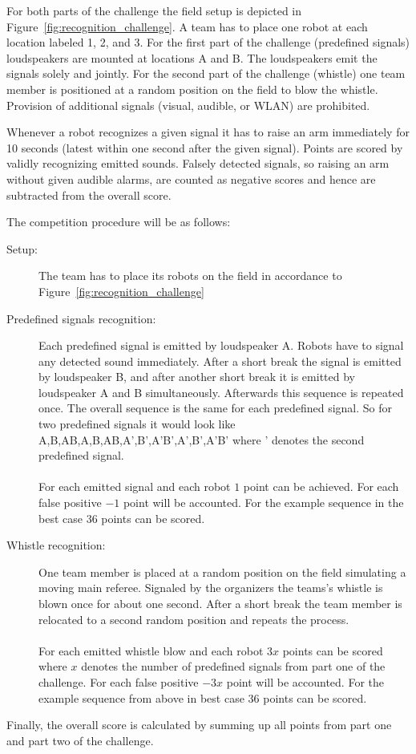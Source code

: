 \documentclass[12pt]{article}
\begin{document}
For both parts of the challenge the field setup is depicted in Figure~\ref{fig:recognition_challenge}. A team has to place one robot at each location labeled 1, 2, and 3. For the first part of the challenge (predefined signals) loudspeakers are mounted at locations A and B. The loudspeakers emit the signals solely and jointly. For the second part of the challenge (whistle) one team member is positioned at a random position on the field to blow the whistle. Provision of additional signals (visual, audible, or WLAN) are prohibited.

Whenever a robot recognizes a given signal it has to raise an arm immediately for 10 seconds (latest within one second after the given signal).
Points are scored by validly recognizing emitted sounds. Falsely detected signals, so raising an arm without given audible alarms, are counted as negative scores and hence are subtracted from the overall score.

The competition procedure will be as follows:

\begin{description}
	\item[Setup:] The team has to place its robots on the field in accordance to Figure~\ref{fig:recognition_challenge}
	\item[Predefined signals recognition:] Each predefined signal is emitted by loudspeaker A. Robots have to signal any detected sound immediately. After a short break the signal is emitted by loudspeaker B, and after another short break it is emitted by loudspeaker A and B simultaneously. Afterwards this sequence is repeated once. The overall sequence is the same for each predefined signal. So for two predefined signals it would look like A,B,AB,A,B,AB,A',B',A'B',A',B',A'B' where ' denotes the second predefined signal.\\
	\\For each emitted signal and each robot $1$ point can be achieved. For each false positive $-1$ point will be accounted. For the example sequence in the best case $36$ points can be scored.
	\item[Whistle recognition:] One team member is placed at a random position on the field simulating a moving main referee. Signaled by the organizers the teams's whistle is blown once for about one second. After a short break the team member is relocated to a second random position and repeats the process.\\
	\\ For each emitted whistle blow and each robot $3x$ points can be scored where $x$ denotes the number of predefined signals from part one of the challenge. For each false positive $-3x$ point will be accounted. For the example sequence from above in best case $36$ points can be scored.
\end{description}

Finally, the overall score is calculated by summing up all points from part one and part two of the challenge.
\end{document}
